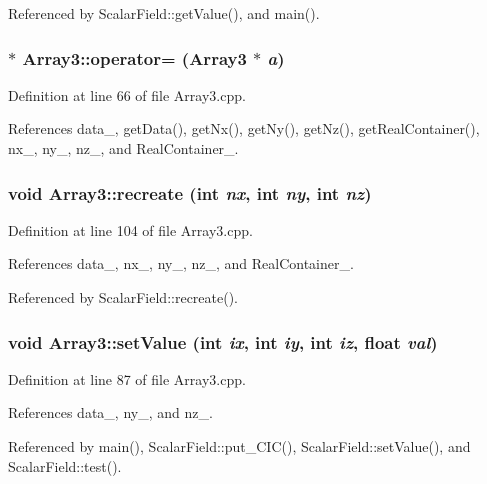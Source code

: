 Referenced by ScalarField::getValue(), and main().

\subsubsection[{operator=}]{ $\ast$ Array3::operator= ({\bf Array3} $\ast$ {\em a})}\label{classArray3_a94c897c53a7dd53b61d9cc89dfa0d708}


Definition at line 66 of file Array3.cpp.



References data\_\-, getData(), getNx(), getNy(), getNz(), getRealContainer(), nx\_\-, ny\_\-, nz\_\-, and RealContainer\_\-.

\subsubsection[{recreate}]{\setlength{\rightskip}{0pt plus 5cm}void Array3::recreate (int {\em nx}, \/  int {\em ny}, \/  int {\em nz})}\label{classArray3_a089a93d07ebfdc31376291dd1475e800}


Definition at line 104 of file Array3.cpp.



References data\_\-, nx\_\-, ny\_\-, nz\_\-, and RealContainer\_\-.



Referenced by ScalarField::recreate().

\subsubsection[{setValue}]{\setlength{\rightskip}{0pt plus 5cm}void Array3::setValue (int {\em ix}, \/  int {\em iy}, \/  int {\em iz}, \/  float {\em val})}\label{classArray3_ac07bb97510a09e2dc5121ee9ed36af3c}


Definition at line 87 of file Array3.cpp.



References data\_\-, ny\_\-, and nz\_\-.



Referenced by main(), ScalarField::put\_\-CIC(), ScalarField::setValue(), and ScalarField::test().



